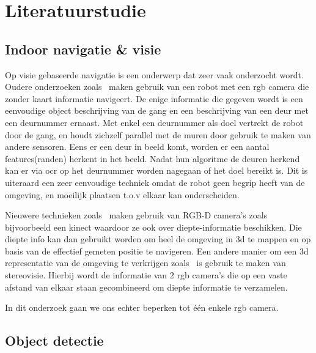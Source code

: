
\chapter{Literatuurstudie}

    \section{Indoor navigatie \& visie}
        Op visie gebaseerde navigatie is een onderwerp dat zeer vaak onderzocht wordt. Oudere onderzoeken zoals~\cite{Tomono2000} maken gebruik van een robot met een \gls{rgb} camera die zonder kaart informatie navigeert.
        De enige informatie die gegeven wordt is een eenvoudige object beschrijving van de gang en een beschrijving van een deur met een deurnummer ernaast.
        Met enkel een deurnummer als doel vertrekt de robot door de gang, en houdt zichzelf parallel met de muren door gebruik te maken van andere sensoren. Eens er een deur in beeld komt, worden er een aantal features(randen)
        herkent in het beeld.
        Nadat hun algoritme de deuren herkend kan er via \gls{ocr} op het deurnummer worden nagegaan of het doel bereikt is.
        Dit is uiteraard een zeer eenvoudige techniek omdat de robot geen begrip heeft van de omgeving, en moeilijk plaatsen t.o.v elkaar kan onderscheiden.

        Nieuwere technieken zoals~\cite{Henry10rgb-dmapping} maken gebruik van RGB-D camera's zoals bijvoorbeeld een kinect waardoor ze ook over diepte-informatie beschikken.
        Die diepte info kan dan gebruikt worden om heel de omgeving in 3d te mappen en op basis van de effectief gemeten positie te navigeren.
        Een andere manier om een 3d representatie van de omgeving te verkrijgen zoals~\cite{schmid2013} is gebruik te maken van stereovisie.
        Hierbij wordt de informatie van 2 \gls{rgb} camera's die op een vaste afstand van elkaar staan gecombineerd om diepte informatie te verzamelen.

        In dit onderzoek gaan we ons echter beperken tot \'{e}\'{e}n enkele \gls{rgb} camera.
        
    \section{Object detectie}

